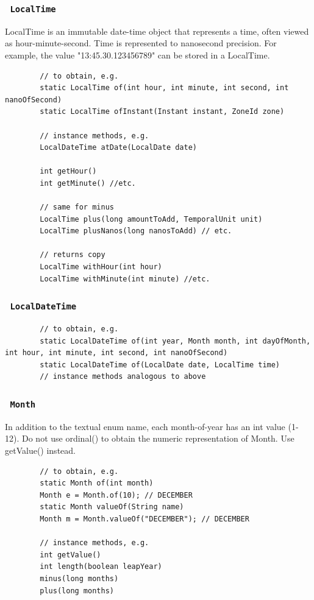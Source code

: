\documentclass{scrartcl}
\begin{document}
\subsubsection{\lstinline$ LocalTime $}

    LocalTime is an immutable date-time object that represents a time, often viewed as hour-minute-second. Time is represented to nanosecond precision. For example, the value "13:45.30.123456789" can be stored in a LocalTime.

    \begin{lstlisting}
        // to obtain, e.g.
        static LocalTime of(int hour, int minute, int second, int nanoOfSecond)
        static LocalTime ofInstant(Instant instant, ZoneId zone)

        // instance methods, e.g.
        LocalDateTime atDate(LocalDate date)

        int getHour()
        int getMinute() //etc.

        // same for minus
        LocalTime plus(long amountToAdd, TemporalUnit unit)
        LocalTime plusNanos(long nanosToAdd) // etc.

        // returns copy
        LocalTime withHour(int hour)
        LocalTime withMinute(int minute) //etc.
        \end{lstlisting}

\subsubsection{\lstinline$ LocalDateTime $}

    \begin{lstlisting}
        // to obtain, e.g.
        static LocalDateTime of(int year, Month month, int dayOfMonth, int hour, int minute, int second, int nanoOfSecond)
        static LocalDateTime of(LocalDate date, LocalTime time)
        // instance methods analogous to above
    \end{lstlisting}

\subsubsection{\lstinline$ Month $}

    In addition to the textual enum name, each month-of-year has an int value (1-12).
    Do not use ordinal() to obtain the numeric representation of Month. Use getValue() instead.

    \begin{lstlisting}
        // to obtain, e.g.
        static Month of(int month)
        Month e = Month.of(10); // DECEMBER
        static Month valueOf(String name)
        Month m = Month.valueOf("DECEMBER"); // DECEMBER

        // instance methods, e.g.
        int getValue()
        int length(boolean leapYear)
        minus(long months)
        plus(long months)
    \end{lstlisting}
\end{document}
